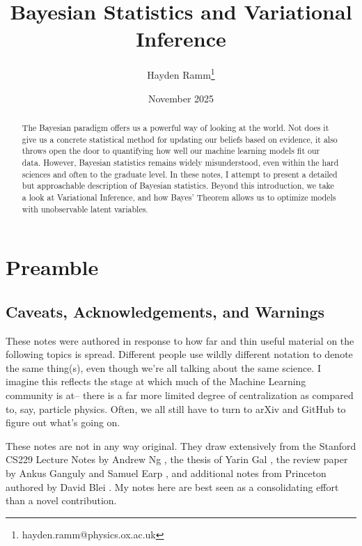 \documentclass[]{article}
\begin{document}
\title{Bayesian Statistics and Variational Inference}
\author[]{Hayden Ramm\thanks{hayden.ramm@physics.ox.ac.uk}}


\date{November 2025}

\maketitle

\begin{abstract}
    The Bayesian paradigm offers us a powerful way of looking at the world. Not does it give us a concrete statistical method for updating our beliefs based on evidence, it also throws open the door to quantifying how well our machine learning models fit our data. However, Bayesian statistics remains widely misunderstood, even within the hard sciences and often to the graduate level. In these notes, I attempt to present a detailed but approachable description of Bayesian statistics. Beyond this introduction, we take a look at Variational Inference, and how Bayes' Theorem allows us to optimize models with unobservable latent variables.
\end{abstract}

\tableofcontents

\section{Preamble}


\subsection{Caveats, Acknowledgements, and Warnings}

These notes were authored in response to how far and thin useful material on the following topics is spread. Different people use wildly different notation to denote the same thing(s), even though we're all talking about the same science. I imagine this reflects the stage at which much of the Machine Learning community is at-- there is a far more limited degree of centralization as compared to, say, particle physics. Often, we all still have to turn to arXiv and GitHub to figure out what's going on.

These notes are not in any way original. They draw extensively from the Stanford CS229 Lecture Notes by Andrew Ng \cite{Ng2023}, the thesis of Yarin Gal \cite{Gal2016}, the review paper by Ankus Ganguly and Samuel Earp \cite{Ganguly2021}, and additional notes from Princeton authored by David Blei \cite{Blei}. My notes here are best seen as a consolidating effort than a novel contribution.
\end{document}
